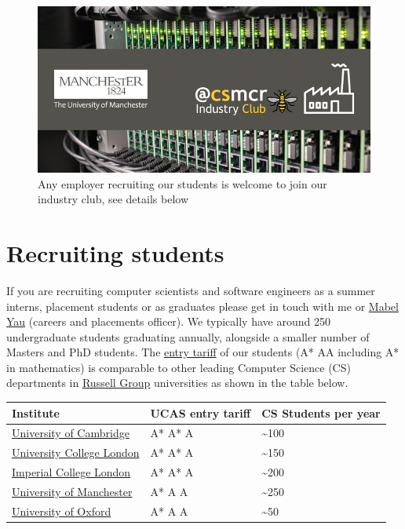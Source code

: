\documentclass[
  12pt,
]{book}
\begin{document}
\begin{figure}

{\centering \includegraphics[width=1\linewidth]{images/industry-club-wide} 

}

\caption{Any employer recruiting our students is welcome to join our industry club, see details below}\label{fig:unnamed-chunk-2}
\end{figure}

\hypertarget{recruiting}{%
\section{Recruiting students}\label{recruiting}}

If you are recruiting computer scientists and software engineers as a summer interns, placement students or as graduates please get in touch with me or \href{https://uk.linkedin.com/in/mabel-yau}{Mabel Yau} (careers and placements officer). We typically have around 250 undergraduate students graduating annually, alongside a smaller number of Masters and PhD students. The \href{https://www.ucas.com/ucas/tariff-calculator}{entry tariff} of our students (A* AA including A* in mathematics) is comparable to other leading Computer Science (CS) departments in \href{https://en.wikipedia.org/wiki/Russell_Group}{Russell Group} universities as shown in the table below.

\begin{longtable}[]{@{}lll@{}}
\toprule
Institute & UCAS entry tariff & CS Students per year\tabularnewline
\midrule
\endhead
\href{https://www.undergraduate.study.cam.ac.uk/courses/computer-science}{University of Cambridge} & A* A* A & \textasciitilde100\tabularnewline
\href{https://www.ucl.ac.uk/prospective-students/undergraduate/degrees/computer-science-bsc/2020}{University College London} & A* A* A & \textasciitilde150\tabularnewline
\href{https://www.imperial.ac.uk/computing/prospective-students/courses/ug/beng-meng-computing/}{Imperial College London} & A* A* A & \textasciitilde200\tabularnewline
\href{https://www.manchester.ac.uk/study/undergraduate/courses/2019/00560/bsc-computer-science/}{University of Manchester} & A* A A & \textasciitilde250\tabularnewline
\href{http://www.ox.ac.uk/admissions/undergraduate/courses-listing/computer-science}{University of Oxford} & A* A A & \textasciitilde50\tabularnewline
\bottomrule
\end{longtable}
\end{document}
